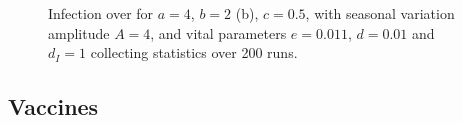\begin{figure}
    \centering
    \caption{Infection over for $a=4$, $b=2$ (b), $c=0.5$, with seasonal variation amplitude $A = 4$, and vital parameters $e=0.011$, $d=0.01$ and $d_I=1$ collecting statistics over 200 runs.}
    \label{fig:seasonalI_over}
\end{figure}



\subsection{Vaccines}

